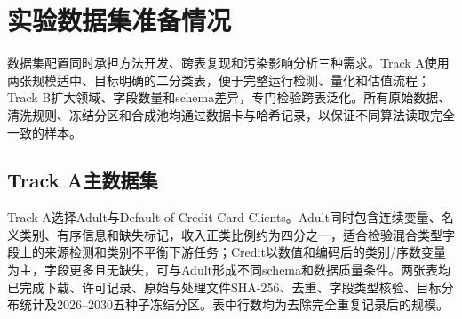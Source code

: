 \documentclass[
  chinese,
  12pt,
  a4paper,
  chinese,
  UTF8]{ctexart}
\begin{document}
\section{实验数据集准备情况}\label{ux5b9eux9a8cux6570ux636eux96c6ux51c6ux5907ux60c5ux51b5}

数据集配置同时承担方法开发、跨表复现和污染影响分析三种需求。Track
A使用两张规模适中、目标明确的二分类表，便于完整运行检测、量化和估值流程；Track
B扩大领域、字段数量和schema差异，专门检验跨表泛化。所有原始数据、清洗规则、冻结分区和合成池均通过数据卡与哈希记录，以保证不同算法读取完全一致的样本。

\subsection{Track A主数据集}\label{track-aux4e3bux6570ux636eux96c6}

Track A选择Adult与Default of Credit Card
Clients。Adult同时包含连续变量、名义类别、有序信息和缺失标记，收入正类比例约为四分之一，适合检验混合类型字段上的来源检测和类别不平衡下游任务；Credit以数值和编码后的类别/序数变量为主，字段更多且无缺失，可与Adult形成不同schema和数据质量条件。两张表均已完成下载、许可记录、原始与处理文件SHA-256、去重、字段类型核验、目标分布统计及2026--2030五种子冻结分区。表中行数均为去除完全重复记录后的规模。
\end{document}
